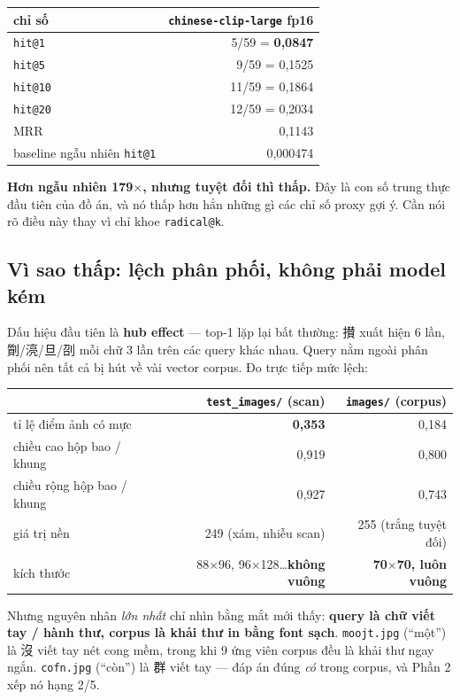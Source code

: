 \documentclass[11pt,a4paper]{article}
\newcommand{\nom}[1]{{\nomfont #1}}
\newcommand{\code}[1]{\texttt{#1}}
\begin{document}
\begin{center}
\begin{tabular}{lr}
\toprule
chỉ số & \code{chinese-clip-large} fp16 \\
\midrule
\code{hit@1} & 5/59 = \textbf{0,0847} \\
\code{hit@5} & 9/59 = 0,1525 \\
\code{hit@10} & 11/59 = 0,1864 \\
\code{hit@20} & 12/59 = 0,2034 \\
MRR & 0,1143 \\
baseline ngẫu nhiên \code{hit@1} & 0,000474 \\
\bottomrule
\end{tabular}
\end{center}

\textbf{Hơn ngẫu nhiên 179$\times$, nhưng tuyệt đối thì thấp.} Đây là con số trung thực đầu tiên của
đồ án, và nó thấp hơn hẳn những gì các chỉ số proxy gợi ý. Cần nói rõ điều này thay vì chỉ khoe
\code{radical@k}.

\subsection{Vì sao thấp: lệch phân phối, không phải model kém}

Dấu hiệu đầu tiên là \textbf{hub effect} --- top-1 lặp lại bất thường: \nom{攅} xuất hiện 6 lần,
\nom{劕/湸/旦/刟} mỗi chữ 3 lần trên các query khác nhau. Query nằm ngoài phân phối nên tất cả bị
hút về vài vector corpus. Đo trực tiếp mức lệch:

\begin{table}[h]
\centering
\begin{tabular}{lrr}
\toprule
 & \code{test\_images/} (scan) & \code{images/} (corpus) \\
\midrule
tỉ lệ điểm ảnh có mực & \textbf{0,353} & 0,184 \\
chiều cao hộp bao / khung & 0,919 & 0,800 \\
chiều rộng hộp bao / khung & 0,927 & 0,743 \\
giá trị nền & 249 (xám, nhiễu scan) & 255 (trắng tuyệt đối) \\
kích thước & 88$\times$96, 96$\times$128\ldots \textbf{không vuông} & \textbf{70$\times$70, luôn vuông} \\
\bottomrule
\end{tabular}
\end{table}

Nhưng nguyên nhân \emph{lớn nhất} chỉ nhìn bằng mắt mới thấy: \textbf{query là chữ viết tay / hành
thư, corpus là khải thư in bằng font sạch}. \code{moojt.jpg} (``một'') là \nom{沒} viết tay nét cong
mềm, trong khi 9 ứng viên corpus đều là khải thư ngay ngắn. \code{cofn.jpg} (``còn'') là \nom{群}
viết tay --- đáp án đúng \emph{có} trong corpus, và Phần 2 xếp nó hạng 2/5.
\end{document}
